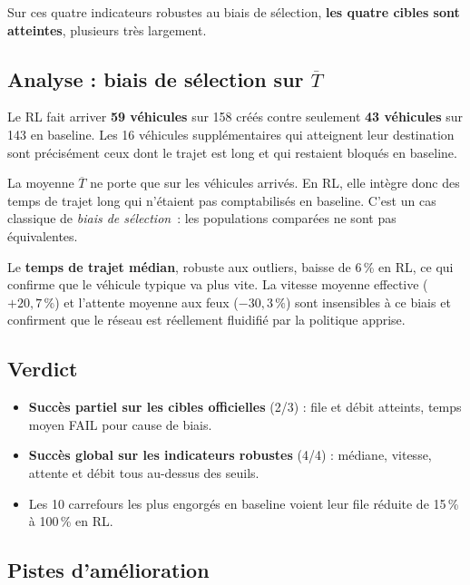 \documentclass[a4paper,10pt]{article}
\begin{document}
Sur ces quatre indicateurs robustes au biais de s\'{e}lection,
\textbf{les quatre cibles sont atteintes}, plusieurs tr\`{e}s largement.

\subsection{Analyse : biais de s\'{e}lection sur $\overline{T}$}

Le RL fait arriver \textbf{59 v\'{e}hicules} sur 158 cr\'{e}\'{e}s contre seulement
\textbf{43 v\'{e}hicules} sur 143 en baseline. Les 16 v\'{e}hicules
suppl\'{e}mentaires qui atteignent leur destination sont pr\'{e}cis\'{e}ment ceux
dont le trajet est long et qui restaient bloqu\'{e}s en baseline.

La moyenne $\overline{T}$ ne porte que sur les v\'{e}hicules arriv\'{e}s. En RL,
elle int\`{e}gre donc des temps de trajet long qui n'\'{e}taient pas
comptabilis\'{e}s en baseline. C'est un cas classique de \emph{biais de
s\'{e}lection}~: les populations compar\'{e}es ne sont pas \'{e}quivalentes.

Le \textbf{temps de trajet m\'{e}dian}, robuste aux outliers, baisse de
6\,\% en RL, ce qui confirme que le v\'{e}hicule typique va plus vite.
La vitesse moyenne effective ($+20{,}7\,\%$) et l'attente moyenne aux
feux ($-30{,}3\,\%$) sont insensibles \`{a} ce biais et confirment que
le r\'{e}seau est r\'{e}ellement fluidifi\'{e} par la politique apprise.

\subsection{Verdict}

\begin{itemize}[leftmargin=1.5em,itemsep=0pt]
  \item \textbf{Succ\`{e}s partiel sur les cibles officielles} (2/3) :
        file et d\'{e}bit atteints, temps moyen FAIL pour cause de biais.
  \item \textbf{Succ\`{e}s global sur les indicateurs robustes} (4/4) :
        m\'{e}diane, vitesse, attente et d\'{e}bit tous au-dessus des seuils.
  \item Les 10 carrefours les plus engorg\'{e}s en baseline voient leur
        file r\'{e}duite de 15\,\% \`{a} 100\,\% en RL.
\end{itemize}

\subsection{Pistes d'am\'{e}lioration}
\end{document}
